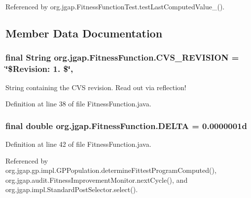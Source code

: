 Referenced by org.\-jgap.\-Fitness\-Function\-Test.\-test\-Last\-Computed\-Value\-\_().



\subsection{Member Data Documentation}
\hypertarget{classorg_1_1jgap_1_1_fitness_function_ab4a9c34ed3bbaabed749120536d897ba}{
\subsubsection[{C\-V\-S\-\_\-\-R\-E\-V\-I\-S\-I\-O\-N}]{\setlength{\rightskip}{0pt plus 5cm}final String org.\-jgap.\-Fitness\-Function.\-C\-V\-S\-\_\-\-R\-E\-V\-I\-S\-I\-O\-N = \char`\"{}\$Revision\-: 1. \$\char`\"{}\hspace{0.3cm}{\ttfamily [static]}, {\ttfamily [private]}}}\label{classorg_1_1jgap_1_1_fitness_function_ab4a9c34ed3bbaabed749120536d897ba}
String containing the C\-V\-S revision. Read out via reflection! 

Definition at line 38 of file Fitness\-Function.\-java.

\hypertarget{classorg_1_1jgap_1_1_fitness_function_a89cbf1ef4c08655f209ce69fde6731e7}{
\subsubsection[{D\-E\-L\-T\-A}]{\setlength{\rightskip}{0pt plus 5cm}final double org.\-jgap.\-Fitness\-Function.\-D\-E\-L\-T\-A = 0.\-0000001d\hspace{0.3cm}{\ttfamily [static]}}}\label{classorg_1_1jgap_1_1_fitness_function_a89cbf1ef4c08655f209ce69fde6731e7}


Definition at line 42 of file Fitness\-Function.\-java.



Referenced by org.\-jgap.\-gp.\-impl.\-G\-P\-Population.\-determine\-Fittest\-Program\-Computed(), org.\-jgap.\-audit.\-Fitness\-Improvement\-Monitor.\-next\-Cycle(), and org.\-jgap.\-impl.\-Standard\-Post\-Selector.\-select().

